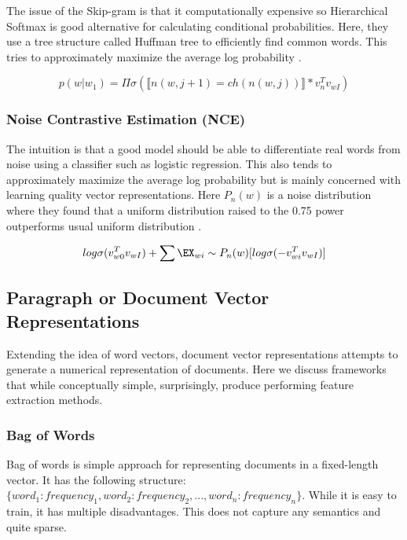 \documentclass[12pt]{article}
\begin{document}
The issue of the Skip-gram is that it computationally expensive so Hierarchical Softmax is good alternative for calculating conditional probabilities. Here, they use a tree structure called Huffman tree to efficiently find common words. This tries to approximately maximize the average log probability \cite{NIPS2013_5021}. 

\begin{equation}
  p(w|w_1) = \Pi \sigma (\llbracket n(w,j+1) = ch(n(w,j))  \rrbracket  * v_n ^ T v_{wI})
\end{equation}


\subsubsection{Noise Contrastive Estimation (NCE)}

The intuition is that a good model should be able to differentiate real words from noise using a classifier such as logistic regression. This also tends to approximately maximize the average log probability but is mainly concerned with learning quality vector representations. Here $P_n(w)$ is a noise distribution where they found that a uniform distribution raised to the 0.75 power outperforms usual uniform distribution \cite{NIPS2013_5021}.

\begin{equation}
    log \sigma(v_{w0}^T v_{wI}) + \sum \EX_{wi} \sim P_n(w)[log\sigma(-v_{wi}^T v_{wI})]
\end{equation}

\begin{center}
\subsection{Paragraph or Document Vector Representations}
\end{center}

Extending the idea of word vectors, document vector representations attempts to generate a numerical representation of documents. Here we discuss frameworks that while conceptually simple, surprisingly, produce performing feature extraction methods.  

\subsubsection{Bag of Words}

Bag of words is simple approach for representing documents in a fixed-length vector. It has the following structure: $\{word_1: frequency_1, word_2: frequency_2, ... , word_n: frequency_n \}$. While it is easy to train, it has multiple disadvantages. This does not capture any semantics and quite sparse.
\end{document}
